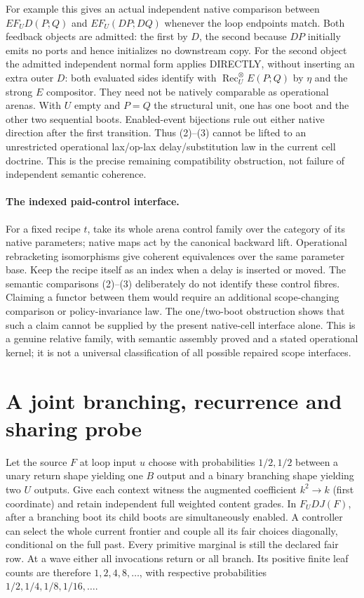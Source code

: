 \documentclass[11pt]{article}
\begin{document}
For example this gives an actual independent native comparison between
$E F_U D(P;Q)$ and $E F_U(DP;DQ)$ whenever the loop endpoints match.
Both feedback objects are admitted: the first by $D$, the second because
$DP$ initially emits no ports and hence initializes no downstream copy.
For the second object the admitted independent normal form applies DIRECTLY,
without inserting an extra outer $D$: both evaluated sides identify with
$\operatorname{Rec}^{\otimes}_U E(P;Q)$ by $\eta$ and the strong $E$
compositor. They need not be natively comparable as operational arenas. With $U$ empty
and $P=Q$ the structural unit, one has one boot and the other two sequential
boots. Enabled-event bijections rule out either native direction after the
first transition. Thus (2)--(3) cannot be lifted to an unrestricted
operational lax/op-lax delay/substitution law in the current cell doctrine.
This is the precise remaining compatibility obstruction, not failure of
independent semantic coherence.

\paragraph{The indexed paid-control interface.}
For a fixed recipe $t$, take its whole arena control family over the category
of its native parameters; native maps act by the canonical backward lift.
Operational rebracketing isomorphisms give coherent equivalences over the
same parameter base. Keep the recipe itself as an index when a delay is
inserted or moved. The semantic comparisons (2)--(3) deliberately do not
identify these control fibres. Claiming a functor between them would require
an additional scope-changing comparison or policy-invariance law. The
one/two-boot obstruction shows that such a claim cannot be supplied by the
present native-cell interface alone. This is a genuine relative family,
with semantic assembly proved and a stated operational kernel; it is not
a universal classification of all possible repaired scope interfaces.

\section{A joint branching, recurrence and sharing probe}
Let the source $F$ at loop input $u$ choose with probabilities $1/2,1/2$
between a unary return shape yielding one $B$ output and a binary branching
shape yielding two $U$ outputs. Give each context witness the augmented
coefficient $k^2\to k$ (first coordinate) and retain independent full weighted
content grades. In $F_U D J(F)$, after a branching boot its child boots are
simultaneously enabled. A controller can select the whole current frontier
and couple all its fair choices diagonally, conditional on the full past.
Every primitive marginal is still the declared fair row. At a wave either
all invocations return or all branch. Its positive finite leaf counts are
therefore $1,2,4,8,\ldots$, with respective probabilities
$1/2,1/4,1/8,1/16,\ldots$.
\end{document}
